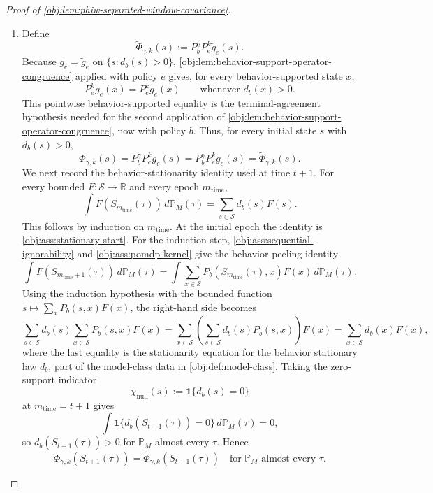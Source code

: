 \begin{proof}[Proof of \cref{obj:lem:phiw-separated-window-covariance}]
\begin{enumerate}
\item Define
\[
\widetilde\Phi_{\gamma,k}(s):=P_b^\gamma P_e^k\widetilde g_e(s).
\]
Because \(g_e=\widetilde g_e\) on \(\{s:d_b(s)>0\}\), \cref{obj:lem:behavior-support-operator-congruence} applied with policy \(e\) gives, for every behavior-supported state \(x\),
\[
P_e^k g_e(x)=P_e^k\widetilde g_e(x)
\qquad\text{whenever }d_b(x)>0.
\]
This pointwise behavior-supported equality is the terminal-agreement hypothesis needed for the second application of \cref{obj:lem:behavior-support-operator-congruence}, now with policy \(b\). Thus, for every initial state \(s\) with \(d_b(s)>0\),
\[
\Phi_{\gamma,k}(s)=P_b^\gamma P_e^k g_e(s)
=P_b^\gamma P_e^k\widetilde g_e(s)
=\widetilde\Phi_{\gamma,k}(s).
\]
We next record the behavior-stationarity identity used at time \(t+1\). For every bounded \(F:\mathcal S\to\mathbb R\) and every epoch \(m_{\mathrm{time}}\),
\[
\int F(S_{m_{\mathrm{time}}}(\tau))\,d\mathbb P_M(\tau)
=
\sum_{s\in\mathcal S}d_b(s)F(s).
\]
This follows by induction on \(m_{\mathrm{time}}\). At the initial epoch the identity is \cref{obj:ass:stationary-start}. For the induction step, \cref{obj:ass:sequential-ignorability} and \cref{obj:ass:pomdp-kernel} give the behavior peeling identity
\[
\int F(S_{m_{\mathrm{time}}+1}(\tau))\,d\mathbb P_M(\tau)
=
\int \sum_{x\in\mathcal S}P_b(S_{m_{\mathrm{time}}}(\tau),x)F(x)\,d\mathbb P_M(\tau).
\]
Using the induction hypothesis with the bounded function \(s\mapsto \sum_x P_b(s,x)F(x)\), the right-hand side becomes
\[
\sum_{s\in\mathcal S}d_b(s)\sum_{x\in\mathcal S}P_b(s,x)F(x)
=
\sum_{x\in\mathcal S}\left(\sum_{s\in\mathcal S}d_b(s)P_b(s,x)\right)F(x)
=
\sum_{x\in\mathcal S}d_b(x)F(x),
\]
where the last equality is the stationarity equation for the behavior stationary law \(d_b\), part of the model-class data in \cref{obj:def:model-class}. Taking the zero-support indicator
\[
\chi_{\mathrm{null}}(s):=\mathbf 1\{d_b(s)=0\}
\]
at \(m_{\mathrm{time}}=t+1\) gives
\[
\int \mathbf 1\{d_b(S_{t+1}(\tau))=0\}\,d\mathbb P_M(\tau)=0,
\]
so \(d_b(S_{t+1}(\tau))>0\) for \(\mathbb P_M\)-almost every \(\tau\). Hence
\[
\Phi_{\gamma,k}(S_{t+1}(\tau))
=
\widetilde\Phi_{\gamma,k}(S_{t+1}(\tau))
\quad\text{for }\mathbb P_M\text{-almost every }\tau .
\] %


\end{enumerate}
\end{proof}
